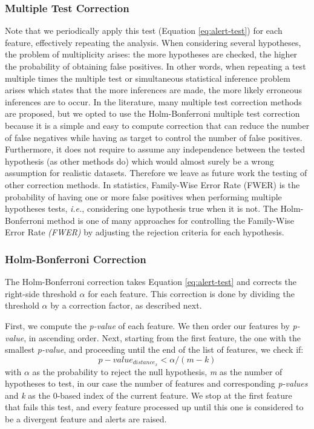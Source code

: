 \subsubsection*{Multiple Test Correction} \label{sec:multi-test}
Note that we periodically apply this test (Equation \ref{eq:alert-test}) for each feature, effectively repeating the analysis. When considering several hypotheses, the problem of multiplicity arises: the more hypotheses are checked, the higher the probability of obtaining false positives. In other words, when repeating a test multiple times the multiple test or simultaneous statistical inference problem \cite{MultiTestProblem-Pubmed}
\cite{MultiTestProblem-Dickhaus2014}
\cite{MultiTestProblem-Miller1966}  \cite{multiple-test-correction-geoffrey} arises which states that the more inferences are made, the more likely erroneous inferences are to occur. In the literature, many multiple test correction methods are proposed, but we opted to use the Holm-Bonferroni multiple test correction because it is a simple and easy to compute correction that can reduce the number of false negatives while having as target to control the number of false positives. Furthermore, it does not require to assume any independence between the tested hypothesis (as other methods do) which would almost surely be a wrong assumption for realistic datasets. Therefore we leave as future work the testing of other correction methods. In statistics, Family-Wise Error Rate (FWER) \cite{MultivariateMT} \cite{MultitestTamhane2018AdvancesIP} is the probability of having one or more false positives when performing multiple hypotheses tests, \textit{i.e.}, considering one hypothesis true when it is not. The Holm-Bonferroni method \cite{HolmBonferroni} is one of many approaches for controlling the Family-Wise Error Rate \textit{(FWER)} by adjusting the rejection criteria for each hypothesis.


\subsubsection*{Holm-Bonferroni Correction} \label{sec:holmbonferroni}
The Holm-Bonferroni correction takes Equation \ref{eq:alert-test} and corrects the right-side threshold $\alpha$ for each feature. This correction is done by dividing the threshold $\alpha$ by a correction factor, as described next.

First, we compute the \textit{p-value} of each feature. We then order our features by \textit{p-value}, in ascending order. Next, starting from the first feature, the one with the smallest \textit{p-value}, and proceeding until the end of the list of features, we check if:
\begin{equation}
    p-value_{distance_{x}} < \alpha / (m - k)
    \label{eq:corrected-pvalue}
\end{equation}
with $\alpha$ as the probability to reject the null hypothesis, \textit{m} as the number of hypotheses to test, in our case the number of features and corresponding \textit{p-values} and \textit{k} as the 0-based index of the current feature. We stop at the first feature that fails this test, and every feature processed up until this one is considered to be a divergent feature and alerts are raised.

